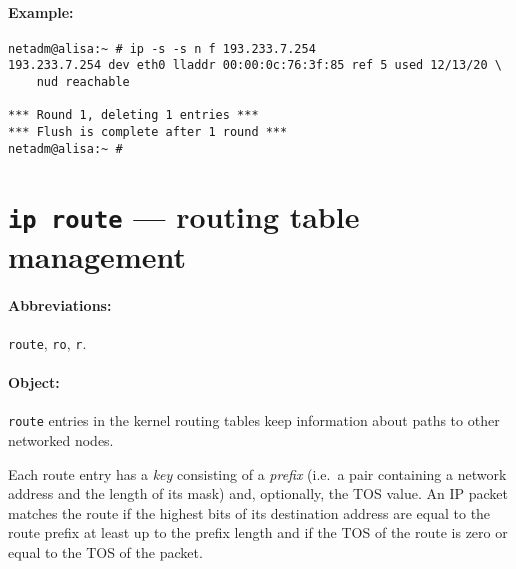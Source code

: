 \paragraph{Example:}
\begin{verbatim}
netadm@alisa:~ # ip -s -s n f 193.233.7.254
193.233.7.254 dev eth0 lladdr 00:00:0c:76:3f:85 ref 5 used 12/13/20 \
    nud reachable

*** Round 1, deleting 1 entries ***
*** Flush is complete after 1 round ***
netadm@alisa:~ # 
\end{verbatim}


\section{{\tt ip route} --- routing table management}
\label{IP-ROUTE}

\paragraph{Abbreviations:} \verb|route|, \verb|ro|, \verb|r|.

\paragraph{Object:} \verb|route| entries in the kernel routing tables keep
information about paths to other networked nodes.

Each route entry has a {\em key\/} consisting of a {\em prefix\/}
(i.e.\ a pair containing a network address and the length of its mask) and,
optionally, the TOS value. An IP packet matches the route if the highest
bits of its destination address are equal to the route prefix at least
up to the prefix length and if the TOS of the route is zero or equal to
the TOS of the packet.
 

